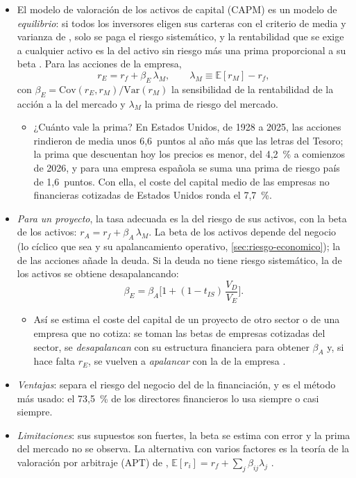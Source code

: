 \documentclass[11pt]{article}
\begin{document}
\begin{itemize}
\item El modelo de valoración de los activos de capital (CAPM)\nocite{Sharpe1964Capital,Lintner1965Valuation,Mossin1966Equilibrium} es un modelo de \emph{equilibrio}: si todos los inversores eligen sus carteras con el criterio de media y varianza de \textcite{Markowitz1952Portfolio}, solo se paga el riesgo sistemático, y la rentabilidad que se exige a cualquier activo es la del activo sin riesgo más una prima proporcional a su beta . Para las acciones de la empresa,
  \[
  r_E=r_f+\beta_E\,\lambda_M,\qquad \lambda_M\equiv\mathbb{E}[r_M]-r_f,
  \]
  con $\beta_E=\mathrm{Cov}(r_E,r_M)/\mathrm{Var}(r_M)$ la sensibilidad de la rentabilidad de la acción a la del mercado y $\lambda_M$ la prima de riesgo del mercado.
  \begin{itemize}
  \item ¿Cuánto vale la prima? En Estados Unidos, de 1928 a 2025, las acciones rindieron de media unos 6,6~puntos al año más que las letras del Tesoro\nocite{Damodaran2026Historical}; la prima que descuentan hoy los precios es menor, del 4,2~\% a comienzos de 2026, y para una empresa española se suma una prima de riesgo país de 1,6~puntos\nocite{Damodaran2026Implied,Damodaran2026Country}. Con ella, el coste del capital medio de las empresas no financieras cotizadas de Estados Unidos ronda el 7,7~\%\nocite{Damodaran2026WACC}.
  \end{itemize}
\item \emph{Para un proyecto}, la tasa adecuada es la del riesgo de sus activos, con la beta de los activos: $r_A=r_f+\beta_A\,\lambda_M$. La beta de los activos depende del negocio (lo cíclico que sea y su apalancamiento operativo, \ref{sec:riesgo-economico}); la de las acciones añade la deuda. Si la deuda no tiene riesgo sistemático, la de los activos se obtiene desapalancando\nocite{Hamada1972Effect}:
  \[
  \beta_E=\beta_A\Big[1+(1-t_{IS})\,\frac{V_D}{V_E}\Big].
  \]
  \begin{itemize}
  \item Así se estima el coste del capital de un proyecto de otro sector o de una empresa que no cotiza: se toman las betas de empresas cotizadas del sector, se \emph{desapalancan} con su estructura financiera para obtener $\beta_A$ y, si hace falta $r_E$, se vuelven a \emph{apalancar} con la de la empresa .
  \end{itemize}
\item \emph{Ventajas}: separa el riesgo del negocio del de la financiación, y es el método más usado: el 73,5~\% de los directores financieros lo usa siempre o casi siempre\nocite{GrahamHarvey2002How}.
\item \emph{Limitaciones}: sus supuestos son fuertes, la beta se estima con error y la prima del mercado no se observa. La alternativa con varios factores es la teoría de la valoración por arbitraje (APT) de \textcite{Ross1976Arbitrage}, $\mathbb{E}[r_i]=r_f+\sum_j\beta_{ij}\lambda_j$ .
\end{itemize}
\end{document}
